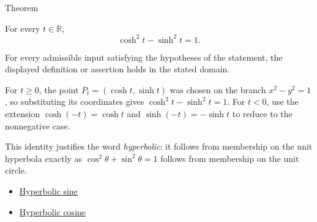 \begin{theorembox}{Theorem}
\begin{theorem}
\label{thm:fundamental-hyperbolic-identity}
For every $t\in\mathbb{R}$,
\[
  \cosh^2 t-\sinh^2 t=1.
\]
\end{theorem}
\end{theorembox}
\begin{remark*}
For every admissible input satisfying the hypotheses of the statement, the
displayed definition or assertion holds in the stated domain.
\end{remark*}

\begin{remark*}[Proof]
For $t\geq 0$, the point $P_t=(\cosh t,\sinh t)$ was chosen on the branch
$x^2-y^2=1$, so substituting its coordinates gives
$\cosh^2 t-\sinh^2 t=1$. For $t<0$, use the extension
$\cosh(-t)=\cosh t$ and $\sinh(-t)=-\sinh t$ to reduce to the nonnegative
case.
\end{remark*}
\begin{remark*}[Interpretation]
This identity justifies the word \emph{hyperbolic}: it follows from membership
on the unit hyperbola exactly as $\cos^2\theta+\sin^2\theta=1$ follows from
membership on the unit circle.
\end{remark*}
\begin{dependencies}
\begin{itemize}
  \item \hyperref[def:hyperbolic-sine]{Hyperbolic sine}
  \item \hyperref[def:hyperbolic-cosine]{Hyperbolic cosine}
\end{itemize}
\end{dependencies}
